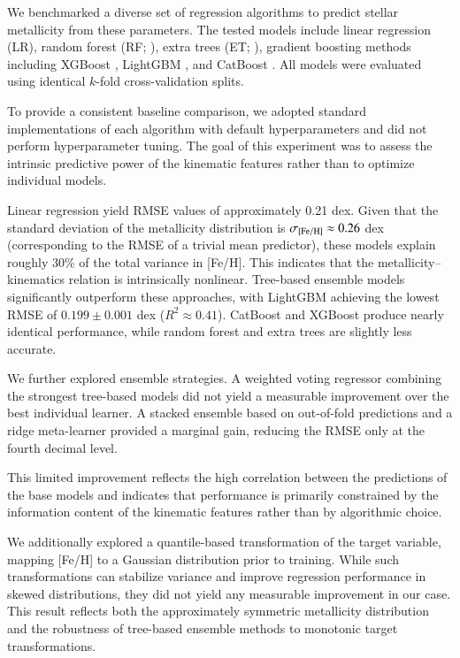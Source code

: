 \documentclass{aa}
\begin{document}
We benchmarked a diverse set of regression algorithms to predict stellar metallicity from these parameters. The tested models include linear regression (LR), random forest (RF; \citealt{breiman2001}), extra trees (ET; \citealt{geurts2006}), gradient boosting methods including XGBoost \citep{chen2016}, LightGBM \citep{ke2017}, and CatBoost \citep{prokhorenkova2018}. All models were evaluated using identical $k$-fold cross-validation splits.

To provide a consistent baseline comparison, we adopted standard implementations of each algorithm with default hyperparameters and did not perform hyperparameter tuning. The goal of this experiment was to assess the intrinsic predictive power of the kinematic features
rather than to optimize individual models.

Linear regression yield RMSE values of approximately 0.21 dex. Given that the standard deviation of the metallicity distribution is $\sigma_{\rm [Fe/H]} \approx 0.26$ dex (corresponding to the RMSE of a trivial mean predictor), these models explain roughly 30\% of the total variance in [Fe/H]. This indicates that the metallicity–kinematics relation is intrinsically nonlinear. Tree-based ensemble models significantly outperform these approaches, with LightGBM achieving the lowest RMSE of $0.199 \pm 0.001$ dex ($R^2 \approx 0.41$). CatBoost and XGBoost produce nearly identical performance, while random forest and extra trees are slightly less accurate.

We further explored ensemble strategies. A weighted voting regressor combining the strongest tree-based models did not yield a measurable improvement over the best individual learner. A stacked ensemble based on out-of-fold predictions and a ridge meta-learner provided a marginal gain, reducing the RMSE only at the fourth decimal level.

This limited improvement reflects the high correlation between the predictions of the base models and indicates that performance is
primarily constrained by the information content of the kinematic features rather than by algorithmic choice.

We additionally explored a quantile-based transformation of the target variable, mapping [Fe/H] to a Gaussian distribution prior to training. While such transformations can stabilize variance and improve regression performance in skewed distributions, they did not yield any measurable improvement in our case. This result reflects both the approximately symmetric metallicity distribution
and the robustness of tree-based ensemble methods to monotonic target transformations.
\end{document}
